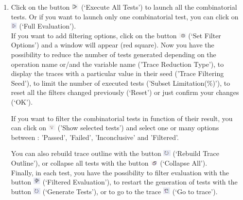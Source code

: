 \documentclass{overturerepchap}
\begin{document}
\newpage
\begin{enumerate}
    \item  Click on the button \includegraphics[width=0.03\textwidth]{snapshots/Icon Execute All Tests.png} (‘Execute All Tests’) to launch all the combinatorial tests. Or if you want to launch only one combinatorial test, you can click on \includegraphics[width=0.025\textwidth]{snapshots/Icon Start Debugging.png}  (‘Full Evaluation’).\\
    If you want to add filtering options, click on the button  \includegraphics[width=0.03\textwidth]{snapshots/Icon Set Filter Options.png}  (‘Set Filter Options’) and a window will appear (red square). Now you have the possibility to reduce the number of tests generated depending on the operation name or/and the variable name ('Trace Reduction Type'), to display the traces with a particular value in their seed ('Trace Filtering Seed'), to limit the number of executed tests ('Subset Limitation(\%)'), to reset all the filters changed previously (‘Reset’) or just confirm your changes (‘OK’).
    
    If you want to filter the combinatorial tests in function of their result, you can click on \includegraphics[width=0.03\textwidth]{snapshots/Icon CT Filtering.png} ('Show selected tests') and select one or many options between : 'Passed', 'Failed', 'Inconclusive' and 'Filtered'.
    
    You can also rebuild trace outline with the button  \includegraphics[width=0.03\textwidth]{snapshots/Icon Rebuild Trace Outline.png}  (‘Rebuild Trace Outline’), or collapse all tests with the button  \includegraphics[width=0.03\textwidth]{snapshots/Icon Collapse All.png}  (‘Collapse All’).\\
    Finally, in each test, you have the possibility to filter evaluation with the button \includegraphics[width=0.03\textwidth]{snapshots/Icon Filtered Evaluation.png}  (‘Filtered Evaluation’), to restart the generation of tests with the button  \includegraphics[width=0.03\textwidth]{snapshots/Icon Rebuild Trace Outline.png}  (‘Generate Tests’), or to go to the trace \includegraphics[width=0.03\textwidth]{snapshots/Icon Go To Trace.png}   (‘Go to trace’).
\end{enumerate}
\end{document}
